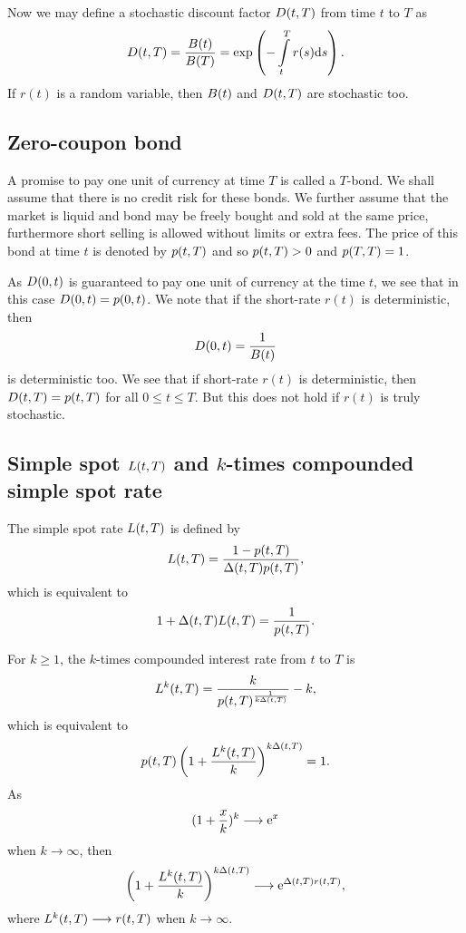 Now we may define a stochastic discount factor $D(t,T)$ from time $t$ to $T$ as
\begin{align}
D(t,T) = \frac{B(t)}{B(T)} = \exp \left( - \int\limits_t^T r(s) \mathrm{d} s \right) .
\end{align}
If $r(t)$ is a random variable, then $B(t)$ and $D(t,T)$ are stochastic too.



\subsection{Zero-coupon bond}

A promise to pay one unit of currency at time $T$ is called a $T$-bond. We shall assume that there is no credit risk for these bonds. We further assume that the market is liquid and bond may be freely bought and sold at the same price, furthermore short selling is allowed without limits or extra fees. The price of this bond at time $t$ is denoted by $p(t,T)$ and so $p(t,T) > 0$ and $p(T,T) = 1$.  

As $D(0,t)$ is guaranteed to pay one unit of currency at the time $t$, we see that in this case $D(0,t) = p(0,t)$. We note that if the short-rate $r(t)$ is deterministic, then
\begin{align}
D(0,t) = \frac{1}{B(t)}
\end{align}
is deterministic too.  We see that if short-rate $r(t)$ is deterministic, then $D(t,T) = p(t,T)$ for all $0 \leq t \leq T$. But this does not hold if $r(t)$ is truly stochastic.

\subsection{Simple spot $L(t,T)$ and $k$-times compounded simple spot rate}

The simple spot rate $L(t,T)$ is defined by
	\begin{align}
		L(t,T) = \frac{1 - p(t,T)}{\Delta(t,T)p(t,T)} ,
	\end{align}
which is equivalent to 
	\begin{align}
		\label{discountandrate}
		1 + \Delta(t,T) L(t,T) = \frac{1}{p(t,T)} .
	\end{align}
	
For $k \geq 1$, the $k$-times compounded interest rate from $t$ to $T$ is
\begin{align}
L^k(t,T) = \frac{k}{p(t,T)^{\frac{1}{k \Delta(t,T)}}} - k,
\end{align}
which is equivalent to 
\begin{align}
p(t,T) \left( 1 + \frac{L^k(t,T)}{k} \right)^{k \Delta(t,T)} = 1 .
\end{align}
As
\begin{align}
(1 + \frac{x}{k})^k \longrightarrow \mathrm{e}^x
\end{align}
when $k \longrightarrow \infty$, then
\begin{align}
\left( 1 + \frac{L^k(t,T)}{k} \right)^{k\Delta(t,T)} \longrightarrow \mathrm{e}^{\Delta(t,T)r(t,T)} ,
\end{align}
where $L^k(t,T) \longrightarrow r(t,T)$ when $k \longrightarrow \infty$. 

